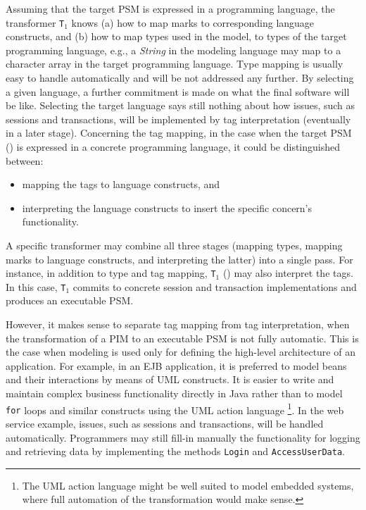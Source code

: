 Assuming that the target PSM is expressed in a programming language, the transformer \texttt{T$_{1}$} knows (a) how to map marks to corresponding language constructs, and (b) how to map types used in the model, to types of the target programming language, e.g., a \textit{String} in the modeling language may map to a character array in the target programming language. Type mapping is usually easy to handle automatically and will be not addressed any further. By selecting a given language, a further commitment is made on what the final software will be like. Selecting the target language says still nothing about how issues, such as sessions and transactions, will be implemented by tag interpretation (eventually in a later stage). Concerning the tag mapping, in the case when the target PSM () is expressed in a concrete programming language, it could be distinguished between:
\begin{itemize}
\item mapping the tags to language constructs, and 
\item interpreting the language constructs to insert the specific concern's functionality.
\end{itemize}
  
A specific transformer may combine all three stages (mapping types, mapping marks to language constructs, and interpreting the latter) into a single pass. For instance, in addition to type and tag mapping, \texttt{T$_{1}$} () may also interpret the tags. In this case, \texttt{T$_{1}$} commits to concrete session and transaction implementations and produces an executable PSM.

However, it makes sense to separate tag mapping from tag interpretation, when the transformation of a  PIM to an executable PSM is not fully automatic. This is the case when modeling is used only for defining the high-level architecture of an application. For example, in an EJB \cite{www.ejb} application, it is preferred to model beans and their interactions by means of UML constructs. It is easier to write and maintain complex business functionality directly in Java rather than to model {\tt for} loops and similar constructs using the UML action language \cite{www.uml}\footnote{The UML action language might be well suited to model embedded systems, where full automation of the transformation would make sense.}. In the web service example, issues, such as sessions and transactions, will be handled automatically. Programmers may still fill-in manually the functionality for logging and retrieving data by implementing the methods {\tt Login} and {\tt AccessUserData}.

